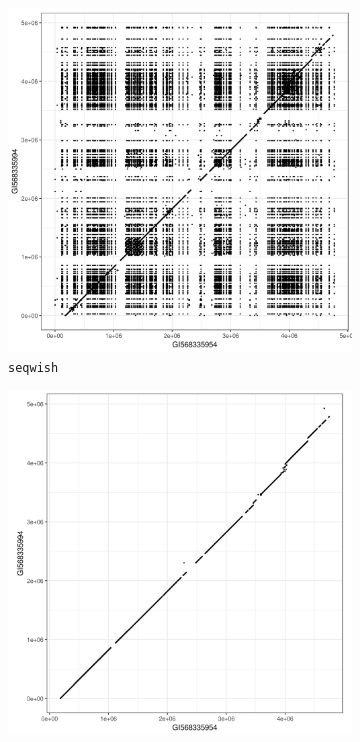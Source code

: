 \documentclass[a4paper,12pt,numbered,oneside]{Classes/PhDThesisPSnPDF}
\begin{document}
\begin{figure}[htbp!]
  \begin{subfigure}[t]{0.49\textwidth}
    \includegraphics[width=1.0\textwidth]{Chapter3/Figs/seqwish_GI568335954_GI568335994_dotplot.png}
    \caption{{\tt seqwish}}
    \label{subfig:seqwish_mhc_dotplot}
  \end{subfigure}
  \begin{subfigure}[t]{0.49\textwidth}
    \includegraphics[width=1.0\textwidth]{Chapter3/Figs/vg_msga_GI568335954_GI568335994_dotplot.png}

\end{subfigure}
\end{figure}
\end{document}
